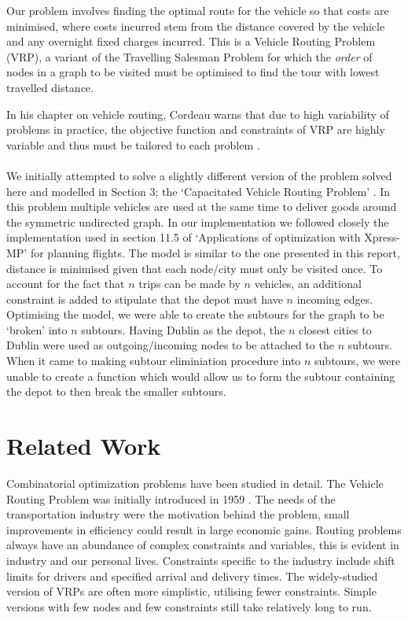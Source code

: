\documentclass[a4paper,11pt]{article}
\begin{document}
Our problem involves finding the optimal route for the vehicle so that costs are minimised, where costs incurred stem from the distance covered by the vehicle and any overnight fixed charges incurred. This is a Vehicle Routing Problem (VRP), a variant of the Travelling Salesman Problem for which the \textit{order} of nodes in a graph to be visited must be optimised to find the tour with lowest travelled distance. 

In his chapter on vehicle routing, Cordeau warns that due to high variability of problems in practice, the objective function and constraints of VRP are highly variable and thus must be tailored to each problem \cite{cordeau2007vehicle}.
\\\\
We initially attempted to solve a slightly different version of the problem solved here and modelled in Section 3; the `Capacitated Vehicle Routing Problem' \cite{toth2002models}. In this problem multiple vehicles are used at the same time to deliver goods around the symmetric undirected graph. In our implementation we followed closely the implementation used in section 11.5 of  `Applications of optimization with Xpress-MP'  \cite{gueret1999applications} for planning flights. The model is similar to the one presented in this report, distance is minimised given that each node/city must only be visited once. To account for the fact that $n$ trips can be made by $n$ vehicles, an additional constraint is added to stipulate that the depot must have $n$ incoming edges. Optimising the model, we were able to create the subtours for the graph to be `broken' into $n$ subtours. Having Dublin as the depot, the $n$ closest cities to Dublin were used as outgoing/incoming nodes to be attached to the $n$ subtours. When it came to making subtour eliminiation procedure into $n$ subtours, we were unable to create a function which would allow us to form the subtour containing the depot to then break the smaller subtours.



\section{Related Work}
Combinatorial optimization problems have been studied in detail.  The Vehicle Routing Problem was initially introduced in 1959 \cite{dantzig1959truck}. The needs of the transportation industry were the motivation behind the problem, small improvements in efficiency could result in large economic gains. Routing problems always have an abundance of complex constraints and variables, this is evident in industry and our personal lives. Constraints specific to the industry include shift limits for drivers and specified arrival and delivery times. The widely-studied version of VRPs are often more simplistic, utilising fewer constraints. Simple versions with few nodes and few constraints still take relatively long to run.
\end{document}
